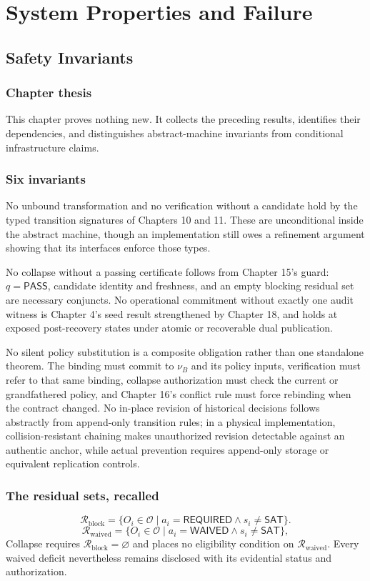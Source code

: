 \documentclass[11pt,openany]{book}
\newcommand{\Pass}{\mathsf{PASS}}
\newcommand{\Waived}{\mathsf{WAIVED}}
\newcommand{\Required}{\mathsf{REQUIRED}}
\begin{document}
\part{System Properties and Failure}

\chapter{Safety Invariants}
\section{Chapter thesis}
This chapter proves nothing new. It collects the preceding results, identifies
their dependencies, and distinguishes abstract-machine invariants from
conditional infrastructure claims.

\section{Six invariants}
No unbound transformation and no verification without a candidate hold by the
typed transition signatures of Chapters 10 and 11. These are unconditional
inside the abstract machine, though an implementation still owes a refinement
argument showing that its interfaces enforce those types.

No collapse without a passing certificate follows from Chapter 15's guard:
\(q=\Pass\), candidate identity and freshness, and an empty blocking residual
set are necessary conjuncts. No operational commitment without exactly one
audit witness is Chapter 4's seed result strengthened by Chapter 18, and holds
at exposed post-recovery states under atomic or recoverable dual publication.

No silent policy substitution is a composite obligation rather than one
standalone theorem. The binding must commit to \(\nu_B\) and its policy inputs,
verification must refer to that same binding, collapse authorization must check
the current or grandfathered policy, and Chapter 16's conflict rule must force
rebinding when the contract changed. No in-place revision of historical
decisions follows abstractly from append-only transition rules; in a physical
implementation, collision-resistant chaining makes unauthorized revision
detectable against an authentic anchor, while actual prevention requires
append-only storage or equivalent replication controls.

\section{The residual sets, recalled}
\[
 \mathcal R_{\mathrm{block}}
 =\{O_i\in\mathcal O\mid a_i=\Required
       \land s_i\neq\mathsf{SAT}\}.
\]
\[
 \mathcal R_{\mathrm{waived}}
 =\{O_i\in\mathcal O\mid a_i=\Waived
       \land s_i\neq\mathsf{SAT}\},
\]
Collapse requires \(\mathcal R_{\mathrm{block}}=\varnothing\) and places no
eligibility condition on \(\mathcal R_{\mathrm{waived}}\). Every waived
deficit nevertheless remains disclosed with its evidential status and
authorization.
\end{document}
